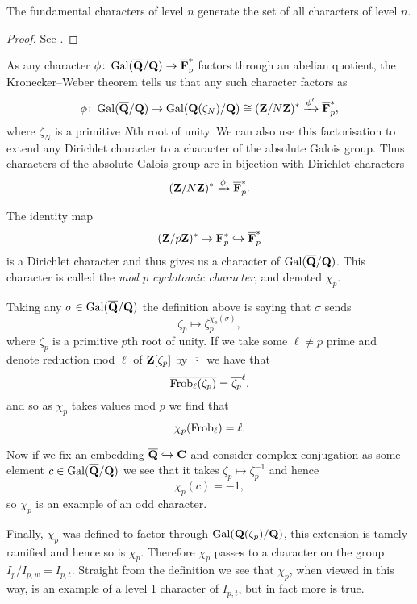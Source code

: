 \documentclass[a4paper,12pt]{article}
\begin{document}
\begin{prop}
The fundamental characters of level $n$ generate the set of all characters of level $n$.
\end{prop}
\begin{proof}
See \cite[prop. 5]{Serre72}.
\end{proof}

As any character $\phi\colon\operatorname{Gal}(\overline{\mathbf{Q}}/\mathbf{Q}) \to \overline{\mathbf{F}}_p^*$ factors through an abelian quotient, the Kronecker--Weber theorem tells us that any such character factors as
\[
\phi\colon\operatorname{Gal}(\overline{\mathbf{Q}}/\mathbf{Q}) \to \operatorname{Gal}(\mathbf{Q}(\zeta_N)/\mathbf{Q})\cong (\mathbf{Z}/N\mathbf{Z})^*\xrightarrow{\phi'}\overline{\mathbf{F}}_p^*,
\]
where $\zeta_N$ is a primitive $N$th root of unity.
We can also use this factorisation to extend any Dirichlet character to a character of the absolute Galois group.
Thus characters of the absolute Galois group are in bijection with Dirichlet characters
\[
(\mathbf{Z}/N\mathbf{Z})^* \xrightarrow{\phi}\overline{\mathbf{F}}_p^*.
\]

\begin{defn}
The identity map
\[
(\mathbf{Z}/p\mathbf{Z})^* \to \mathbf{F}_p^* \hookrightarrow \overline{\mathbf{F}}_p^*
\]
is a Dirichlet character and thus gives us a character of $\operatorname{Gal}(\overline{\mathbf{Q}}/\mathbf{Q})$.
This character is called the \emph{mod $p$ cyclotomic character}, and denoted $\chi_p$.
\end{defn}

\begin{rmk}
Taking any $\sigma\in\operatorname{Gal}(\overline{\mathbf{Q}}/\mathbf{Q})$ the definition above is saying that $\sigma$ sends
\[
\zeta_p\mapsto \zeta_p^{\chi_p(\sigma)},
\]
where $\zeta_p$ is a primitive $p$th root of unity.
If we take some $\ell \ne p$ prime and denote reduction mod $\ell$ of $\mathbf{Z}[\zeta_p]$ by $\overline{\ \cdot\ }$ we have that
\[
\overline{\operatorname{Frob}_\ell(\zeta_p)} = \overline{\zeta_p}^\ell,
\]
and so as $\chi_p$ takes values mod $p$ we find that
\[
\chi_p(\operatorname{Frob}_\ell) = \ell.
\]

Now if we fix an embedding $\overline{\mathbf{Q}}\hookrightarrow\mathbf{C}$ and consider complex conjugation as some element $c\in\operatorname{Gal}(\overline{\mathbf{Q}}/\mathbf{Q})$ we see that it takes $\zeta_p \mapsto\zeta_p^{-1}$ and hence
\[
\chi_p(c) = -1,
\]
so $\chi_p$ is an example of an odd character.

Finally, $\chi_p$ was defined to factor through $\operatorname{Gal}(\mathbf{Q}(\zeta_p)/\mathbf{Q})$, this extension is tamely ramified and hence so is $\chi_p$.
Therefore $\chi_p$ passes to a character on the group $I_{p}/I_{p,w} = I_{p,t}$.
Straight from the definition we see that $\chi_p$, when viewed in this way, is an example of a level 1 character of $I_{p,t}$, but in fact more is true.
\end{rmk}
\end{document}
